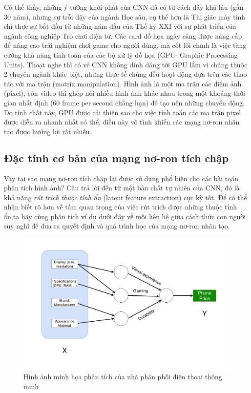 Có thể thấy, những ý tưởng khởi phát của CNN đã có từ cách đây khá lâu (gần 30 năm), nhưng sự trỗi dậy của ngành Học sâu, cụ thể hơn là Thị giác máy tính chỉ thực sự bắt đầu từ những năm đầu của Thế kỷ XXI với sự phát triển của ngành công nghiệp Trò chơi điện tử. Các card đồ họa ngày càng được nâng cấp để nâng cao trải nghiệm chơi game cho người dùng, mà cốt lõi chính là việc tăng cường khả năng tính toán của các bộ xử lý đồ họa (GPU- Graphic Processing Units). Thoạt nghe thì có vẻ CNN không dính dáng tới GPU lắm vì chúng thuộc 2 chuyên ngành khác biệt, nhưng thực tế chúng đều hoạt động dựa trên các thao tác với ma trận (matrix manipulation). Hình ảnh là một ma trận các điểm ảnh (pixel), còn video thì ghép nối nhiều hình ảnh khác nhau trong một khoảng thời gian nhất định (60 frame per second chẳng hạn) để tạo nên những chuyển động. Do tính chất này, GPU được cải thiện sao cho việc tính toán các ma trận pixel được diễn ra nhanh nhất có thể, điều này vô tình khiến các mạng nơ-ron nhân tạo được hưởng lợi rất nhiều.

\subsection{Đặc tính cơ bản của mạng nơ-ron tích chập}

\hspace{\parindent} Vậy tại sao mạng nơ-ron tích chập lại được sử dụng phổ biến cho các bài toán phân tích hình ảnh? Câu trả lời đến từ một bản chất tự nhiên của CNN, đó là khả năng \textit{rút trích thuộc tính ẩn} (latent feature extraction) cực kỳ tốt. Để có thể nhận biết rõ hơn về tầm quan trọng của việc rút trích được những thuộc tính ẩn,ta hãy cùng phân tích ví dụ dưới đây về mối liên hệ giữa cách thức con người suy nghĩ để đưa ra quyết định và quá trình học của mạng nơ-ron nhân tạo.

\begin{figure}[!h]
	\centering
		\includegraphics[width=1.0\columnwidth]{chapter05/figure/CNN_human_thinking.png}
		\centering
	\caption{Hình ảnh minh họa phân tích của nhà phân phối điện thoại thông minh}
	\label{fig:CNNHumanThinking}
\end{figure}

